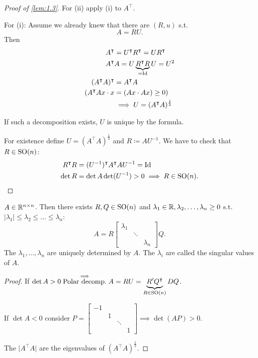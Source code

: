 \begin{proof}[Proof of \ref{lem:1.3}]
    For (ii) apply (i) to \(A^\intercal\).

    For (i): Assume we already knew that there are \((R,u)\) s.t. \[A=RU.\]
    Then \begin{align*}
        A^\intercal & = U^\intercal R^\intercal = UR^\intercal \\
        A^\intercal &A = U \underbrace{R^\intercal R}_{=\text{Id}} U = U^2\\
        (A^\intercal A)^\intercal&=A^\intercal A \\
        (A^\intercal A x\cdot x &= (Ax\cdot A x)\geq 0)\\
        &\implies U=(A^\intercal A)^\frac{1}{2}
    \end{align*}

    If such a decomposition exists, \(U\) is unique by the formula.

    For existence define \(U=(A^\intercal A)^\frac{1}{2}\) and \(R\coloneqq AU^{-1}\). We have to 
    check that \(R\in {\text{SO}}(n)\):
    \begin{align*}
        R^\intercal R &=(U^{-1})^\intercal A^\intercal A U^{-1}=\text{Id}\\
        \det R &=\det A \det (U^{-1})>0\implies R\in {\text{SO}}(n).
    \end{align*}
\end{proof}

\begin{lemma}\label{lem:1.5}
    \(A\in \mathbb{R}^{n\times n}\). Then there exists \(R,Q\in {\text{SO}}(n)\) and \(\lambda_1\in \mathbb{R},\lambda_2,\dots,\lambda_n\geq 0\) s.t. \(|\lambda_1|\leq \lambda_2\leq \dots \leq \lambda_n\):
    \[A=R\begin{bmatrix}
        \lambda_1 &&\\
        &\ddots & \\
        &&\lambda_n
    \end{bmatrix} Q.\]
    The \(\lambda_1,\dots,\lambda_n\) are uniquely determined by \(A\). The \(\lambda_i\) are called 
    the singular values of \(A\).
\end{lemma}

\begin{proof}
    If \(\det A>0\stackrel{\implies}{\text{Polar decomp.}} A=RU=\underbrace{R'Q^\intercal}_{R\in {\text{SO}}(n)} D Q\).

    If \(\det A<0\) consider \(P=\begin{bmatrix}
        -1 & &&\\
        & 1 &&\\
        &&\ddots&\\
        &&&1
    \end{bmatrix}\implies \det(AP)>0\).

    The \(\vert A^\intercal A\vert\) are the eigenvalues of \((A^\intercal A)^\frac{1}{2}\).

\end{proof}

